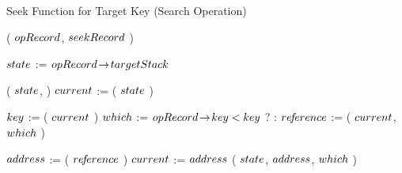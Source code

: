 \begin{limitscope}
\begin{comment}
\end{comment}








\begin{algorithm}[tb]
\caption{Seek Function for Target Key (Search Operation)} 
\label{algo:local-seek:search}
\DefineKeyWords
\DontPrintSemicolon
\Boolean \TraverseTree( $opRecord$, $seekRecord$ )\;
\PrintSemicolon
\label{lin:local-traverse|tree:begin}
\Begin
{
   $state$ := $opRecord \!\rightarrow\! targetStack$\;
	
	 \InitializeTraversalRecord( $state$, \TARGETSTACK{} )\;
	 \label{lin:local-traverse|tree:initialize}
   $current$ := \GetTop( $state$ )\;
	 \label{lin:local-traverse|tree:start}
	 \BlankLine
	 \While{\True}
	 {
			\label{lin:local-traverse|tree:while:begin}
	    $\cKey$ := \GetKey( $current$ )\;
			\label{lin:local-traverse|tree:while:first}
		  $which$ := $opRecord \!\rightarrow\! key < key$ ? \LEFT{} : \RIGHT{}\;
			\label{lin:local-traverse|tree:select}
			$re\!f\!erence$ := \GetChild( $current$, $which$ )\;
			
			\BlankLine
			
		  \lIf{$\opRecord \rarrow \key$ = $\cKey$}
			{ 
			   \Return \True 
				 \label{lin:local-traverse|tree:match}
			}	     
			{ 
			   \Return \False
				 \label{lin:local-traverse|tree:null}
			}	  
				
			\BlankLine
			
			$address$ := \GetAddress( $re\!f\!erence$ )\;
			$current$ := $address$\;
			\AddToTop( $state$, $address$, $which$ )\;
			\label{lin:local-traverse|tree:stack}
			\label{lin:local-traverse|tree:while:end}
			      
}}
\end{algorithm}
\end{limitscope}
